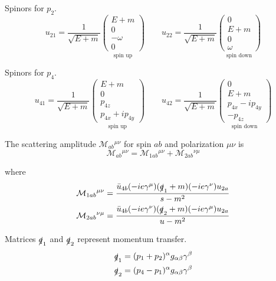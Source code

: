 Spinors for $p_2$.
\begin{equation*}
u_{21}=\frac{1}{\sqrt{E+m}}
\underset{\text{spin up}}
{\begin{pmatrix}
E+m\\
0\\
-\omega\\
0
\end{pmatrix}}
\qquad
u_{22}=\frac{1}{\sqrt{E+m}}
\underset{\text{spin down}}
{\begin{pmatrix}
0\\
E+m\\
0\\
\omega
\end{pmatrix}}
\end{equation*}

Spinors for $p_4$.
\begin{equation*}
u_{41}=\frac{1}{\sqrt{E+m}}
\underset{\text{spin up}}
{\begin{pmatrix}
E+m\\
0\\
p_{4z}\\
p_{4x}+ip_{4y}
\end{pmatrix}}
\qquad
u_{42}=\frac{1}{\sqrt{E+m}}
\underset{\text{spin down}}
{\begin{pmatrix}
0\\
E+m\\
p_{4x}-ip_{4y}\\
-p_{4z}
\end{pmatrix}}
\end{equation*}

The scattering amplitude $\mathcal M_{ab}{}^{\mu\nu}$
for spin $ab$ and polarization $\mu\nu$ is
\begin{equation*}
\mathcal M_{ab}{}^{\mu\nu}=\mathcal M_{1ab}{}^{\mu\nu}+\mathcal M_{2ab}{}^{\nu\mu}
\end{equation*}

where
\begin{align*}
\mathcal M_{1ab}{}^{\mu\nu}
&=\frac{\bar{u}_{4b}(-ie\gamma^\mu)(\slashed{q}_1+m)(-ie\gamma^\nu)u_{2a}}{s-m^2}
\\
\mathcal M_{2ab}{}^{\nu\mu}
&=\frac{\bar{u}_{4b}(-ie\gamma^\nu)(\slashed{q}_2+m)(-ie\gamma^\mu)u_{2a}}{u-m^2}
\end{align*}

Matrices $\slashed q_1$ and $\slashed q_2$ represent momentum transfer.
\begin{align*}
\slashed q_1&=(p_1+p_2)^\alpha g_{\alpha\beta}\gamma^\beta
\\
\slashed q_2&=(p_4-p_1)^\alpha g_{\alpha\beta}\gamma^\beta
\end{align*}

